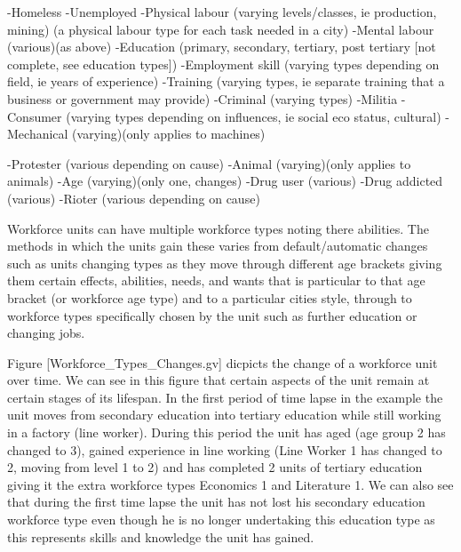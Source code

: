 -Homeless
-Unemployed
-Physical labour (varying levels/classes, ie production, mining)
	(a physical labour type for each task needed in a city) 
-Mental labour (various)(as above)
-Education (primary, secondary, tertiary, post tertiary [not complete, see education types])
-Employment skill (varying types depending on field, ie years of experience)
-Training (varying types, ie separate training that a business or government may provide)
-Criminal (varying types)
-Militia
-Consumer (varying types depending on influences, ie social eco status, cultural)
-Mechanical (varying)(only applies to machines)

-Protester (various depending on cause)
-Animal (varying)(only applies to animals)
-Age (varying)(only one, changes)
-Drug user (various)
-Drug addicted (various)
-Rioter (various depending on cause)




Workforce units can have multiple workforce types noting there abilities. The methods in which the units gain these varies from default/automatic changes such as units changing types as they move through different age brackets giving them certain effects, abilities, needs, and wants that is particular to that age bracket (or workforce age type) and to a particular cities style, through to workforce types specifically chosen by the unit such as further education or changing jobs. 

Figure [Workforce_Types_Changes.gv] dicpicts the change of a workforce unit over time. We can see in this figure that certain aspects of the unit remain at certain stages of its lifespan. In the first period of time lapse in the example the unit moves from secondary education into tertiary education while still working in a factory (line worker). During this period the unit has aged (age group 2 has changed to 3), gained experience in line working (Line Worker 1 has changed to 2, moving from level 1 to 2) and has completed 2 units of tertiary education giving it the extra workforce types Economics 1 and Literature 1. We can also see that during the first time lapse the unit has not lost his secondary education workforce type even though he is no longer undertaking this education type as this represents skills and knowledge the unit has gained. 

